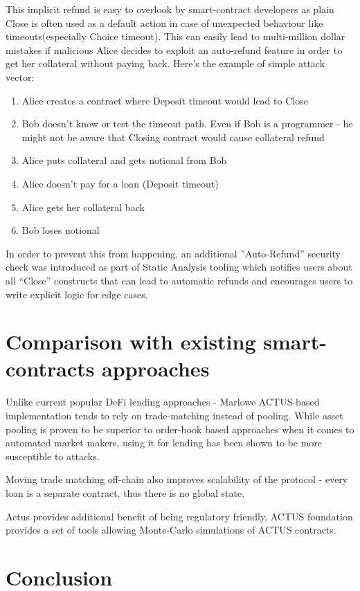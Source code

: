 \documentclass[runningheads]{llncs}
\begin{document}
This implicit refund is easy to overlook by smart-contract developers
as plain Close is often used as a default action in case of unexpected
behaviour like timeouts(especially Choice timeout). This can easily
lead to multi-million dollar mistakes if malicious Alice decides to
exploit an auto-refund feature in order to get her collateral without
paying back. Here's the example of simple attack vector: 
\begin{enumerate}
\item Alice creates a contract where Deposit timeout would lead to Close 
\item Bob doesn't know or test the timeout path. Even if Bob is a programmer
- he might not be aware that Closing contract would cause collateral
refund 
\item Alice puts collateral and gets notional from Bob 
\item Alice doesn't pay for a loan (Deposit timeout) 
\item Alice gets her collateral back 
\item Bob loses notional 
\end{enumerate}
In order to prevent this from happening, an additional ''Auto-Refund''
security check was introduced as part of Static Analysis tooling which
notifies users about all ``Close'' constructs that can lead to automatic
refunds and encourages users to write explicit logic for edge cases.

\section{Comparison with existing smart-contracts approaches }

Unlike current popular DeFi lending approaches - Marlowe ACTUS-based
implementation tends to rely on trade-matching instead of pooling.
While asset pooling is proven to be superior to order-book based approaches
when it comes to automated market makers, using it for lending has
been shown to be more susceptible to attacks\cite{flash-loan}.

Moving trade matching off-chain also improves scalability of the protocol
- every loan is a separate contract, thus there is no global state.

Actus provides additional benefit of being regulatory friendly, ACTUS
foundation provides a set of tools allowing Monte-Carlo simulations
of ACTUS contracts.

\section{Conclusion}
\end{document}
